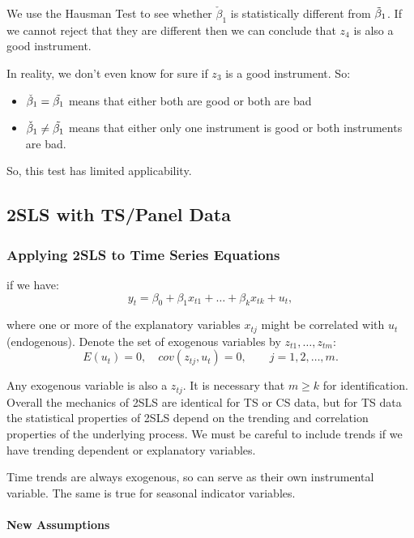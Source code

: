 \documentclass[11pt]{article}
\begin{document}
We use the Hausman Test to see whether $\check{\beta}_1$ is statistically different from $\Tilde{\beta}_1$. If we cannot reject that they are different then we can conclude that $z_4$ is also a good instrument.

In reality, we don't even know for sure if $z_3$ is a good instrument. So:
\begin{itemize}
    \item $\check{\beta}_1 = \Tilde{\beta_1}$ means that either both are good or both are bad
    \item $\check{\beta}_1 \neq \Tilde{\beta_1}$ means that either only one instrument is good or both instruments are bad.
\end{itemize}
So, this test has limited applicability.

\subsection{2SLS with TS/Panel Data}

\subsubsection{Applying 2SLS to Time Series Equations}

if we have:
\begin{equation}
\label{2SLS TS original eq}
    y_t = \beta_0 + \beta_1 x_{t1} + \ldots + \beta_k x_{tk} + u_t,
\end{equation}

where one or more of the explanatory variables $x_{tj}$ might be correlated with $u_t$ (endogenous). Denote the set of exogenous variables by $z_{t1},\ldots, z_{tm}$:
\[E(u_t)=0, \quad cov(z_{tj},u_t)=0, \qquad j = 1,2,\ldots, m.\]

Any exogenous variable is also a $z_{tj}$. It is necessary that $m\geq k$ for identification. Overall the mechanics of 2SLS are identical for TS or CS data, but for TS data the statistical properties of 2SLS depend on the trending and correlation properties of the underlying process. We must be careful to include trends if we have trending dependent or explanatory variables.
\begin{note}
    Time trends are always exogenous, so can serve as their own instrumental variable. The same is true for seasonal indicator variables.
\end{note}

\paragraph{New Assumptions} \mbox{}
\end{document}
